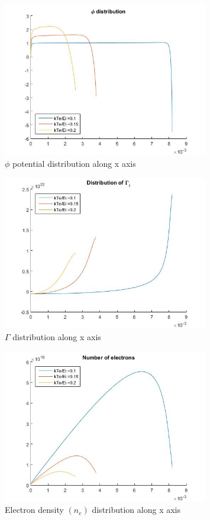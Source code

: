\begin{figure}[h!]
	\centering
	\includegraphics[width=0.8\textwidth]{img/Phi.jpg}
	\caption{$\phi$ potential distribution along x axis}
	\label{fig:phi}
\end{figure}

\begin{figure}[h!]
	\centering
	\includegraphics[width=0.8\textwidth]{img/Gamma_i.jpg}
	\caption{$\Gamma$ distribution along x axis}
	\label{fig:gamma}
\end{figure}

\begin{figure}[h!]
	\centering
	\includegraphics[width=0.8\textwidth]{img/Electrons_number.jpg}
	\caption{Electron density $(n_e)$ distribution along x axis}
	\label{fig:ne}
\end{figure}

